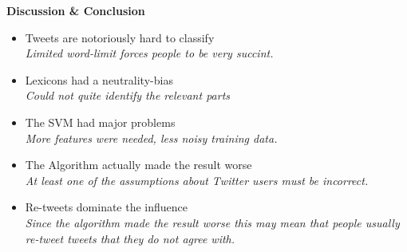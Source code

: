 \documentclass[landscape,20pt]{extarticle}
\newcommand*{\TitleFont}{\Huge \bf}
\newcommand*{\TextFont}{\normalsize \it}
\begin{document}
\newpage
\thispagestyle{empty}
\mbox{}

\clearpage
\thispagestyle{empty}

{\TitleFont Discussion \& Conclusion}
\Large
\begin{itemize}
\item Tweets are notoriously hard to classify\\
{\TextFont Limited word-limit forces people to be very succint.}
\item Lexicons had a neutrality-bias\\
{\TextFont Could not quite identify the relevant parts}
\item The SVM had major problems\\
{\TextFont More features were needed, less noisy training data.}
\item The Algorithm actually made the result worse\\
{\TextFont At least one of the assumptions about Twitter users must be incorrect.}
\item Re-tweets dominate the influence\\
{\TextFont Since the algorithm made the result worse this may mean that people usually re-tweet tweets that they do not agree with.}
\end{itemize}
\end{document}
